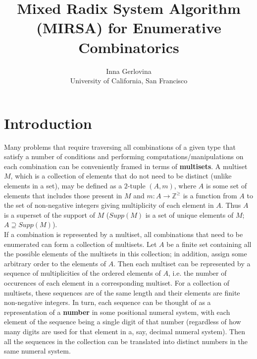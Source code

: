 \documentclass[12pt]{article}
\begin{document}

\title{Mixed Radix System Algorithm (MIRSA) for Enumerative Combinatorics}
\author{Inna Gerlovina \\
  {\footnotesize University of California, San Francisco}}
\maketitle

\section{Introduction}

Many problems that require traversing all combinations of a given type that satisfy a number of conditions and performing computations/manipulations on each combination can be conveniently framed in terms of \textbf{multisets}. A multiset $M$, which is a collection of elements that do not need to be distinct (unlike elements in a set), may be defined as a $2$-tuple $(A, m)$, where $A$ is some set of elements that includes those present in $M$ and $m:A \to \mathbb{Z}^{\geqslant}$ is a function from $A$ to the set of non-negative integers giving multiplicity of each element in $A$. Thus $A$ is a superset of the support of $M$ ($Supp(M)$ is a set of unique elements of $M$; $A \supseteq Supp(M)$). \\

If a combination is represented by a multiset, all combinations that need to be enumerated can form a collection of multisets. Let $A$ be a finite set containing all the possible elements of the multisets in this collection; in addition, assign some arbitrary order to the elements of $A$. Then each multiset can be represented by a sequence of multiplicities of the ordered elements of $A$, i.e. the number of occurences of each element in a corresponding multiset. For a collection of multisets, these sequences are of the same length and their elements are finite non-negative integers. In turn, each sequence can be thought of as a representation of a \textbf{number} in some positional numeral system, with each element of the sequence being a single digit of that number (regardless of how many digits are used for that element in a, say, decimal numeral system). Then all the sequences in the collection can be translated into distinct numbers in the same numeral system. \\
\end{document}
